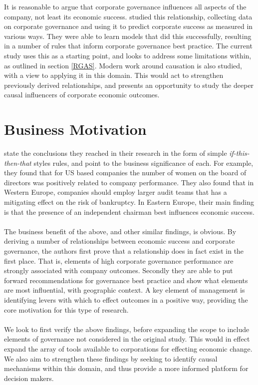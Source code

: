 {It is reasonable to argue that corporate governance influences all aspects of the company, not least its economic success. \cite{moldovan2015learning} studied this relationship, collecting data on corporate governance and using it to predict corporate success as measured in various ways. They were able to learn models that did this successfully, resulting in a number of rules that inform corporate governance best practice. The current study uses this as a starting point, and looks to address some limitations within, as outlined in section \ref{RGAS}. Modern work around causation is also studied, with a view to applying it in this domain. This would act to strengthen previously derived relationships, and presents an opportunity to study the deeper causal influencers of corporate economic outcomes.}
\section{Business Motivation}
{\cite{moldovan2015learning} state the conclusions they reached in their research in the form of simple {\it if-this-then-that} styles rules, and point to the business significance of each. For example, they found that for US based companies the number of women on the board of directors was positively related to company performance. They also found that in Western Europe, companies should employ larger audit teams that has a mitigating effect on the risk of bankruptcy. In Eastern Europe, their main finding is that the presence of an independent chairman best influences economic success.\\\\ 
The business benefit of the above, and other similar findings, is obvious. By deriving a number of relationships between economic success and corporate governance, the authors first prove that a relationship does in fact exist in the first place. That is, elements of high corporate governance performance are strongly associated with company outcomes. Secondly they are able to put forward recommendations for governance best practice and show what elements are most influential, with geographic context. A key element of management is identifying levers with which to effect outcomes in a positive way, providing the core motivation for this type of research.\\\\
We look to first verify the above findings, before expanding the scope to include elements of governance not considered in the original study. This would in effect expand the array of tools available to corporations for effecting economic change. We also aim to strengthen these findings by seeking to identify causal mechanisms within this domain,  and thus provide a more informed platform for decision makers. }
